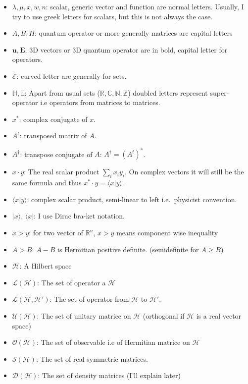 \documentclass[10pt]{report}
\theoremstyle{plain}
\theoremstyle{definition}
\theoremstyle{remark}
\newcommand{\R}{\ensuremath{\mathbb{R}}}
\newcommand{\N}{\ensuremath{\mathbb{N}}}
\newcommand{\Z}{\ensuremath{\mathbb{Z}}}
\newcommand{\C}{\ensuremath{\mathbb{C}}}
\newcommand{\ket}[1]{|#1\rangle}
\newcommand{\bra}[1]{\langle#1|}
\newcommand{\braket}[2]{\langle#1|#2\rangle}
\renewcommand{\geq}{\geqslant}
\newcommand{\bs}{\boldsymbol}
\begin{document}
\begin{itemize}
  \item $\lambda,\mu,x,w,n$: scalar, generic vector and function are normal
    letters.
    Usually, I try to use greek letters for scalars, but this is not always the case.
  \item $A,B,H$: quantum operator or more generally matrices are capital letters
  \item $\bs u, \bs E$, 3D vectors or 3D quantum operator are in bold, capital
    letter for operators.
  \item $\mathcal{E}$: curved letter are generally for sets.
  \item $\mathbb H, \mathbb E$: Apart from usual sets ($\R,\C,\N,\Z$) doubled
    letters represent super-operator i.e operators from matrices to matrices.
  \item $x^*$: complex conjugate of $x$.
  \item $A^t$: transposed matrix of $A$.
  \item $A^\dagger$: transpose conjugate of $A$: $A^\dagger = {(A^t)}^*$.
  \item $x \cdot y$: The real scalar product $\sum_i x_i y_i$. On complex vectors it
    will still be the same formula and thus $x^* \cdot y = \braket x y$.
  \item $\braket x y$: complex scalar product, semi-linear to left i.e.\ physicist convention.
  \item $\ket x$, $\bra x$: I use Dirac bra-ket notation.
  \item $x > y$: for two vector of $\R^n$, $x > y$ means component wise inequality
  \item $A > B$: $A - B$ is Hermitian positive definite. (semidefinite for $A
    \geq B$)
  \item $\mathcal{H}$: A Hilbert space
  \item $\mathcal{L}(\mathcal{H})$: The set of operator a $\mathcal{H}$
  \item $\mathcal{L}(\mathcal{H}, \mathcal{H}')$: The set of operator from
    $\mathcal{H}$ to $\mathcal{H}'$.
  \item $\mathcal{U}(\mathcal{H})$: The set of unitary matrice on $\mathcal{H}$
    (orthogonal if $\mathcal{H}$ is a real vector space)
  \item $\mathcal{O}(\mathcal{H})$: The set of observable i.e of Hermitian matrice on $\mathcal{H}$
  \item $\mathcal{S}(\mathcal{H})$: The set of real symmetric matrices.
  \item $\mathcal{D}(\mathcal{H})$: The set of density matrices (I'll explain later)

\end{itemize}
\end{document}
